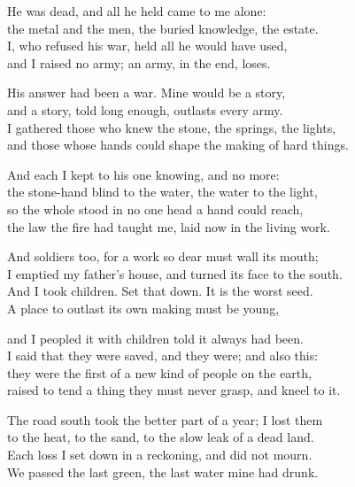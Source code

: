 \begin{founder}
\ornament

He was dead, and all he held came to me alone:\\
the metal and the men, the buried knowledge, the estate.\\
I, who refused his war, held all he would have used,\\
and I raised no army; an army, in the end, loses.\\
\medskip

His answer had been a war. Mine would be a story,\\
and a story, told long enough, outlasts every army.\\
I gathered those who knew the stone, the springs, the lights,\\
and those whose hands could shape the making of hard things.\\
\medskip

And each I kept to his one knowing, and no more:\\
the stone-hand blind to the water, the water to the light,\\
so the whole stood in no one head a hand could reach,\\
the law the fire had taught me, laid now in the living work.\\
\medskip

And soldiers too, for a work so dear must wall its mouth;\\
I emptied my father's house, and turned its face to the south.\\
And I took children. Set that down. It is the worst seed.\\
A place to outlast its own making must be young,\\
\medskip

and I peopled it with children told it always had been.\\
I said that they were saved, and they were; and also this:\\
they were the first of a new kind of people on the earth,\\
raised to tend a thing they must never grasp, and kneel to it.\\
\medskip

The road south took the better part of a year; I lost them\\
to the heat, to the sand, to the slow leak of a dead land.\\
Each loss I set down in a reckoning, and did not mourn.\\
We passed the last green, the last water mine had drunk.\\
\medskip


\end{founder}
